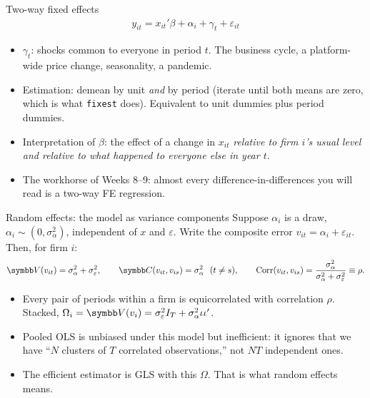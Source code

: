 \documentclass[aspectratio=169,11pt]{beamer}
\begin{document}
\begin{frame}{Two-way fixed effects}
\begin{align*}
	y_{it} = x_{it}'\beta + \alpha_i + \gamma_t + \varepsilon_{it}
\end{align*}
\begin{itemize}
	\item $\gamma_t$: shocks common to everyone in period $t$. The business cycle, a platform-wide
	price change, seasonality, a pandemic.
	\medskip
	\item Estimation: demean by unit \emph{and} by period (iterate until both means are zero, which
	is what \texttt{fixest} does). Equivalent to unit dummies plus period dummies.
	\medskip
	\item Interpretation of $\beta$: the effect of a change in $x_{it}$ \emph{relative to firm $i$'s
	usual level and relative to what happened to everyone else in year $t$}.
	\medskip
	\item The workhorse of Weeks 8--9: almost every difference-in-differences you will read is a
	two-way FE regression.
\end{itemize}
\end{frame}


\begin{frame}{Random effects: the model as variance components}
Suppose $\alpha_i$ is a draw, $\alpha_i \sim (0, \sigma^2_\alpha)$, independent of $x$ and $\varepsilon$.
Write the composite error $v_{it} = \alpha_i + \varepsilon_{it}$. Then, for firm $i$:
\begin{align*}
	\Var(v_{it}) = \sigma^2_\alpha + \sigma^2_\varepsilon, \qquad
	\Cov(v_{it}, v_{is}) = \sigma^2_\alpha \ \ (t \ne s), \qquad
	\text{Corr}(v_{it}, v_{is}) = \frac{\sigma^2_\alpha}{\sigma^2_\alpha + \sigma^2_\varepsilon} \equiv \rho .
\end{align*}
\begin{itemize}
	\item Every pair of periods within a firm is \alert{equicorrelated} with correlation $\rho$.
	Stacked, $\Omega_i = \Var(v_i) = \sigma^2_\varepsilon I_T + \sigma^2_\alpha \iota\iota'$.
	\medskip
	\item Pooled OLS is unbiased under this model but inefficient: it ignores that we have
	``$N$ clusters of $T$ correlated observations,'' not $NT$ independent ones.
	\medskip
	\item The efficient estimator is GLS with this $\Omega$. That is what \alert{random effects} means.
\end{itemize}
\end{frame}
\end{document}
